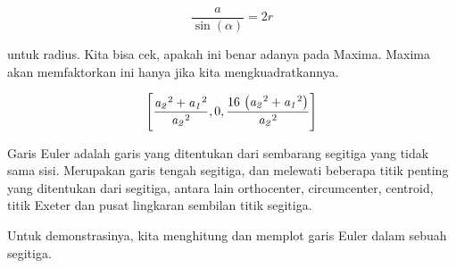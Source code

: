 \documentclass[a4paper,10pt]{article}
\begin{document}
\begin{eulernotebook}
\begin{eulercomment}
\begin{eulercomment}
\begin{eulercomment}
\begin{eulercomment}
\begin{eulercomment}
\end{eulercomment}
\begin{eulerformula}
\[
\frac{a}{\sin(\alpha)}=2r
\]
\end{eulerformula}
\begin{eulercomment}
untuk radius. Kita bisa cek, apakah ini benar adanya pada Maxima.
Maxima akan memfaktorkan ini hanya jika kita mengkuadratkannya.
\end{eulercomment}
\begin{eulerformula}
\[
\left[ \frac{{\it a_2}^2+{\it a_1}^2}{{\it a_2}^2} , 0 , \frac{16\,  \left({\it a_2}^2+{\it a_1}^2\right)}{{\it a_2}^2} \right] 
\]
\end{eulerformula}
\begin{eulercomment}
Garis Euler adalah garis yang ditentukan dari sembarang segitiga yang
tidak sama sisi. Merupakan garis tengah segitiga, dan melewati
beberapa titik penting yang ditentukan dari segitiga, antara lain
orthocenter, circumcenter, centroid, titik Exeter dan pusat lingkaran
sembilan titik segitiga.

Untuk demonstrasinya, kita menghitung dan memplot garis Euler dalam
sebuah segitiga.


\end{eulercomment}
\end{eulercomment}
\end{eulercomment}
\end{eulercomment}
\end{eulercomment}
\end{eulernotebook}
\end{document}
